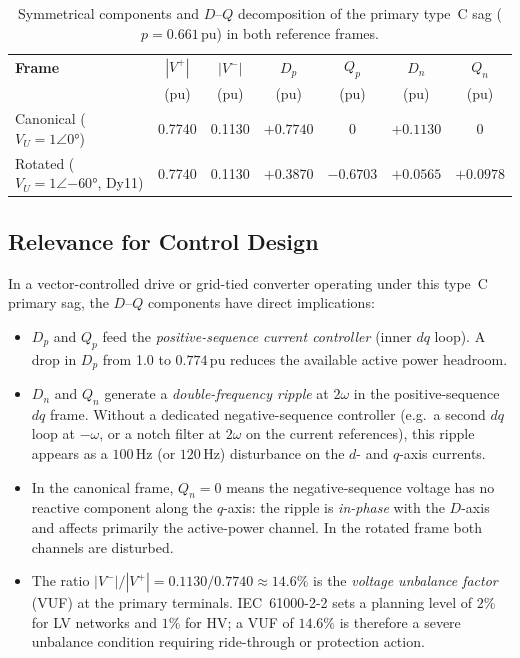 \documentclass[a4paper,11pt]{article}
\begin{document}
\begin{table}[h!]
\centering
\caption{Symmetrical components and $D$--$Q$ decomposition of the
         primary type~C sag ($p = 0.661\,\mathrm{pu}$) in both reference frames.}
\label{tab:dq}
\begin{tabular}{lcccccc}
\toprule
\textbf{Frame} & $|V^+|$ & $|V^-|$ & $D_p$ & $Q_p$ & $D_n$ & $Q_n$ \\
               & (pu)    & (pu)    & (pu)  & (pu)  & (pu)  & (pu)  \\
\midrule
Canonical ($V_U = 1\angle 0°$)         & 0.7740 & 0.1130 & $+0.7740$ & $0$       & $+0.1130$ & $0$       \\
Rotated ($V_U = 1\angle{-60°}$, Dy11)  & 0.7740 & 0.1130 & $+0.3870$ & $-0.6703$ & $+0.0565$ & $+0.0978$ \\
\bottomrule
\end{tabular}
\end{table}

\subsection{Relevance for Control Design}

In a vector-controlled drive or grid-tied converter operating under this
type~C primary sag, the $D$--$Q$ components have direct implications:

\begin{itemize}
  \item $D_p$ and $Q_p$ feed the \emph{positive-sequence current
        controller} (inner $dq$ loop).  A drop in $D_p$ from 1.0 to
        $0.774\,\mathrm{pu}$ reduces the available active power headroom.

  \item $D_n$ and $Q_n$ generate a \emph{double-frequency ripple} at
        $2\omega$ in the positive-sequence $dq$ frame.  Without a
        dedicated negative-sequence controller (e.g.\ a second $dq$ loop
        at $-\omega$, or a notch filter at $2\omega$ on the current
        references), this ripple appears as a $100\,\mathrm{Hz}$ (or
        $120\,\mathrm{Hz}$) disturbance on the $d$- and $q$-axis currents.

  \item In the canonical frame, $Q_n = 0$ means the negative-sequence
        voltage has no reactive component along the $q$-axis: the ripple
        is \emph{in-phase} with the $D$-axis and affects primarily the
        active-power channel.  In the rotated frame both channels are
        disturbed.

  \item The ratio $|V^-|/|V^+| = 0.1130/0.7740 \approx 14.6\%$
        is the \emph{voltage unbalance factor} (VUF) at the primary
        terminals.  IEC~61000-2-2 sets a planning level of $2\%$ for LV
        networks and $1\%$ for HV; a VUF of $14.6\%$ is therefore a
        severe unbalance condition requiring ride-through or protection
        action.
\end{itemize}
\end{document}
